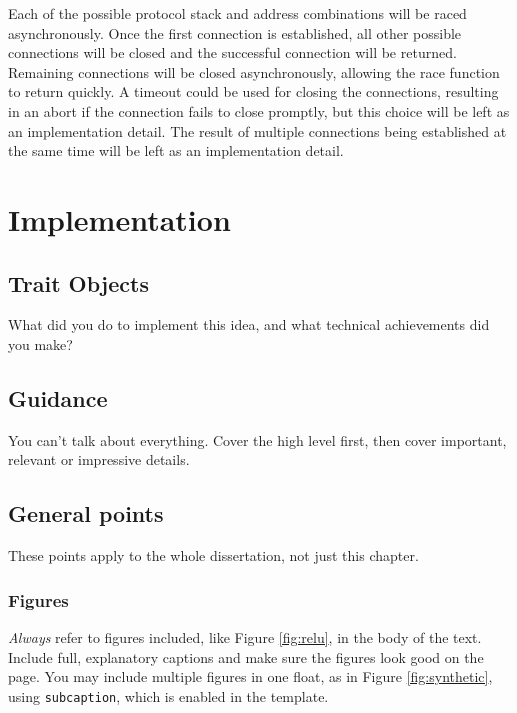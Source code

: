 \documentclass{l4proj}
\begin{document}
Each of the possible protocol stack and address combinations will be raced asynchronously.
Once the first connection is established, all other possible connections will be closed and the successful connection
will be returned.
Remaining connections will be closed asynchronously, allowing the race function to return quickly.
A timeout could be used for closing the connections, resulting in an abort if the connection fails to close promptly,
but this choice will be left as an implementation detail.
The result of multiple connections being established at the same time will be left as an implementation detail.

\chapter{Implementation}

\section{Trait Objects}


What did you do to implement this idea, and what technical achievements did you make?
\section{Guidance}
You can't talk about everything. Cover the high level first, then cover important, relevant or impressive details.



\section{General points}

These points apply to the whole dissertation, not just this chapter.



\subsection{Figures}
\emph{Always} refer to figures included, like Figure \ref{fig:relu}, in the body of the text. Include full, explanatory captions and make sure the figures look good on the page.
You may include multiple figures in one float, as in Figure \ref{fig:synthetic}, using \texttt{subcaption}, which is enabled in the template.
\end{document}
